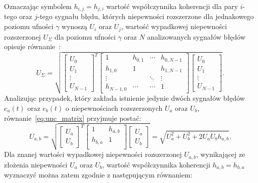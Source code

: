 Oznaczając symbolem $h_{i,j} = h_{j,i}$ wartość współczynnika koherencji dla pary $i$-tego oraz $j$-tego sygnału błędu, których niepewności rozszerzone dla jednakowego poziomu ufności $\gamma$ wynoszą $U_{i}$ oraz $U_{j}$, wartość wypadkowej niepewności rozszerzonej $U_{\Sigma}$ dla poziomu ufności $\gamma$ oraz $N$ analizowanych sygnałów błędów opisuje równanie~\cite{jakubiec_redmono}:
\begin{equation}
U_{\Sigma} = \sqrt{
\begin{bmatrix}
U_{0} \\ U_{1} \\ \vdots \\ U_{N-1}
\end{bmatrix}^{T}
\begin{bmatrix}
1         & h_{0,1} & \cdots & h_{0,N-1} \\
h_{1,0}   & 1       &        & h_{1,N-1} \\
\vdots    &         & \ddots & \vdots    \\
h_{N-1,0} & \cdots  & \cdots & 1
\end{bmatrix}
\begin{bmatrix}
U_{0} \\ U_{1} \\ \vdots \\ U_{N-1}
\end{bmatrix}}
\label{eq:unc_matrix}.
\end{equation}
Analizując przypadek, który zakłada istnienie jedynie dwóch sygnałów błędów $e_{a}(t)$ oraz $e_{b}(t)$ o niepewnościach rozszerzonych $U_{a}$ oraz $U_{b}$, równanie~\eqref{eq:unc_matrix} przyjmuje postać:
\begin{equation}
U_{a,b} = \sqrt{
\begin{bmatrix}
U_{a} \\ U_{b}
\end{bmatrix}^{T}
\begin{bmatrix}
1         & h_{a,b} \\
h_{b,a}   & 1       \\
\end{bmatrix}
\begin{bmatrix}
U_{a} \\ U_{b}
\end{bmatrix}} =
\sqrt{U_{a}^{2} + U_{b}^{2} + 2 U_{a} U_{b} h_{a,b}}
\label{eq:unc_mattwo}.
\end{equation}
Dla znanej wartości wypadkowej niepewności rozszerzonej $U_{a,b}$, wynikającej ze złożenia niepewności $U_{a}$ oraz $U_{b}$, wartość współczynnika koherencji $h_{a,b} = h_{b,a}$ wyznaczyć można zatem zgodnie z następującym równaniem:
